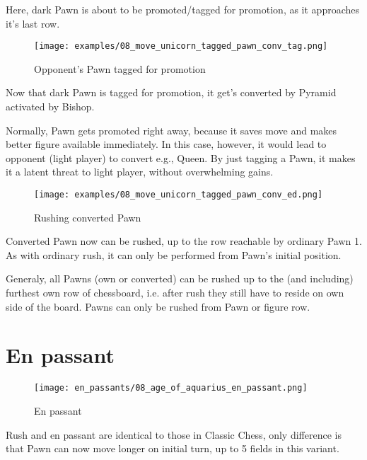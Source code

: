 Here, dark Pawn is about to be promoted/tagged for promotion, as it approaches
it's last row.

\clearpage %

\noindent
\begin{figure}[h]
\texttt{[image: examples/08\_move\_unicorn\_tagged\_pawn\_conv\_tag.png]}
\caption{Opponent's Pawn tagged for promotion}
\label{fig:08_move_unicorn_tagged_pawn_conv_tag}
\end{figure}

Now that dark Pawn is tagged for promotion, it get's converted by Pyramid
activated by Bishop.

Normally, Pawn gets promoted right away, because it saves move and makes better
figure available immediately. In this case, however, it would lead to opponent
(light player) to convert e.g., Queen. By just tagging a Pawn, it makes it a
latent threat to light player, without overwhelming gains.

\clearpage %

\noindent
\begin{figure}[h]
\texttt{[image: examples/08\_move\_unicorn\_tagged\_pawn\_conv\_ed.png]}
\caption{Rushing converted Pawn}
\label{fig:08_move_unicorn_tagged_pawn_conv_ed}
\end{figure}

Converted Pawn now can be rushed, up to the row reachable by ordinary Pawn 1.
As with ordinary rush, it can only be performed from Pawn's initial position.

Generaly, all Pawns (own or converted) can be rushed up to the (and including)
furthest own row of chessboard, i.e. after rush they still have to reside on
own side of the board. Pawns can only be rushed from Pawn or figure row.

\clearpage %

\section*{En passant}

\noindent
\begin{wrapfigure}{l}{0.4\textwidth}
\centering
\texttt{[image: en\_passants/08\_age\_of\_aquarius\_en\_passant.png]}
\caption{En passant}
\label{fig:08_age_of_aquarius_en_passant}
\end{wrapfigure}
Rush and en passant are identical to those in Classic Chess, only difference
is that Pawn can now move longer on initial turn, up to 5 fields in this
variant.

